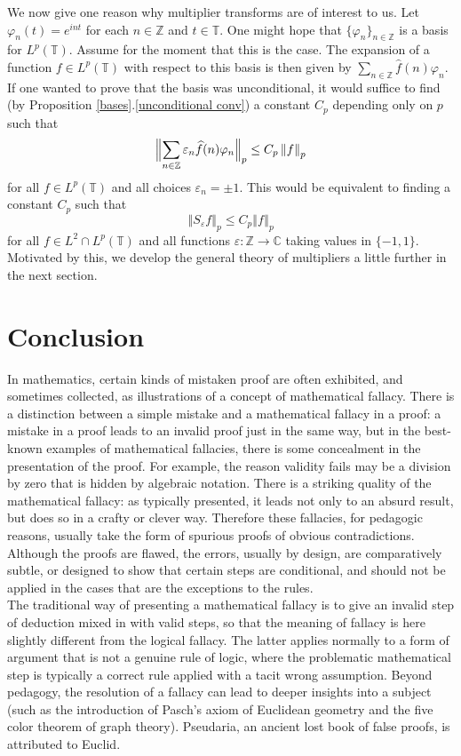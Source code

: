 \documentclass[honours,12pt]{unswthesis}
\newcommand{\C}{\mathbb{C}}
\newcommand{\T}{\mathbb{T}}
\newcommand{\Z}{\mathbb{Z}}
\newcommand{\hatt}[1]{\widehat #1}
\newcommand{\reff}[2]{\ref{#1}.\ref{#2}}
\def\norm#1{\left \Vert #1 \right \Vert}
\def\snorm#1{\Bigl \Vert #1 \Bigr \Vert}
\numberwithin{equation}{section}
\begin{document}
We now give one reason why multiplier transforms are of interest to us.
Let $\varphi_n(t)=e^{int}$ for each $n\in\Z$ and $t\in\T$. One might hope that
$\{\varphi_n\}_{n\in\Z}$ is a basis for $L^p(\T)$. Assume for the moment that 
this is the case. The expansion of a
function $f\in L^p(\T)$ with respect to this basis is then given by
$\sum_{n\in\Z}\hatt{f}(n)\varphi_n$. 
If one wanted to prove that the basis was unconditional, it would suffice to
find (by Proposition \reff{bases}{unconditional conv}) a constant $C_p$
depending only on $p$ such that
\[\snorm{\sum_{n\in\Z}\varepsilon_n\hatt{f}(n)\varphi_n}_p\leq C_p\norm{f}_p\]
for all $f\in L^p(\T)$ and all choices
$\varepsilon_n=\pm 1$. This would be
equivalent to finding a constant $C_p$ such that
\[\norm{S_{\varepsilon}f}_p\leq C_p\norm{f}_p\]
for all $f\in L^2\cap L^p(\T)$ and all functions $\varepsilon:\Z\rightarrow\C$
taking values in $\{-1,1\}$. Motivated by this, we develop the general theory of
multipliers a little further in the next section.


\chapter{Conclusion}\label{ccl}

In mathematics, certain kinds of mistaken proof are often exhibited, and sometimes collected, as illustrations of a concept of mathematical fallacy. There is a distinction between a simple mistake and a mathematical fallacy in a proof: a mistake in a proof leads to an invalid proof just in the same way, but in the best-known examples of mathematical fallacies, there is some concealment in the presentation of the proof. For example, the reason validity fails may be a division by zero that is hidden by algebraic notation. There is a striking quality of the mathematical fallacy: as typically presented, it leads not only to an absurd result, but does so in a crafty or clever way. Therefore these fallacies, for pedagogic reasons, usually take the form of spurious proofs of obvious contradictions. Although the proofs are flawed, the errors, usually by design, are comparatively subtle, or designed to show that certain steps are conditional, and should not be applied in the cases that are the exceptions to the rules. \\

\noindent The traditional way of presenting a mathematical fallacy is to give an invalid step of deduction mixed in with valid steps, so that the meaning of fallacy is here slightly different from the logical fallacy. The latter applies normally to a form of argument that is not a genuine rule of logic, where the problematic mathematical step is typically a correct rule applied with a tacit wrong assumption. Beyond pedagogy, the resolution of a fallacy can lead to deeper insights into a subject (such as the introduction of Pasch's axiom of Euclidean geometry and the five color theorem of graph theory). Pseudaria, an ancient lost book of false proofs, is attributed to Euclid. \\
\end{document}
